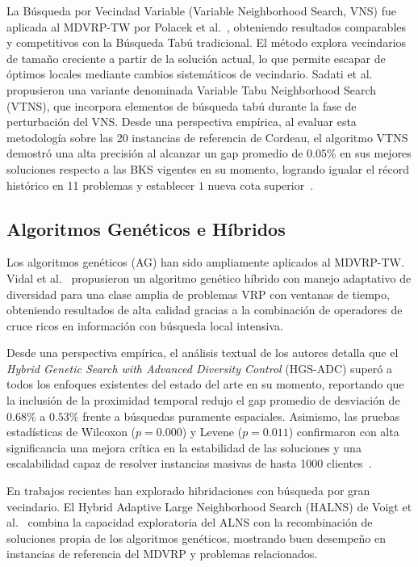 \documentclass[letter, 10pt, dvipdfmx]{article}
\begin{document}
La Búsqueda por Vecindad Variable (Variable Neighborhood Search, VNS) fue aplicada al MDVRP-TW por Polacek et al.~\cite{VNS2004},
obteniendo resultados comparables y competitivos con la Búsqueda Tabú tradicional. El método explora vecindarios de tamaño
creciente a partir de la solución actual, lo que permite escapar de óptimos locales mediante cambios
sistemáticos de vecindario.
Sadati et al.~\cite{Sadati2021} propusieron una variante denominada Variable Tabu Neighborhood Search (VTNS),
que incorpora elementos de búsqueda tabú durante la fase de perturbación del VNS.
Desde una perspectiva empírica, al evaluar esta metodología sobre las 20 instancias de referencia de Cordeau,
el algoritmo VTNS demostró una alta precisión al alcanzar un gap promedio de $0.05\%$ en sus mejores soluciones
respecto a las BKS vigentes en su momento, logrando igualar el récord histórico en 11 problemas y establecer $1$ nueva
cota superior~\cite{Sadati2021}.

\subsection{Algoritmos Genéticos e Híbridos}

Los algoritmos genéticos (AG) han sido ampliamente aplicados al MDVRP-TW. Vidal et al.~\cite{VidalAG2013}
propusieron un algoritmo genético híbrido con manejo adaptativo de diversidad para una
clase amplia de problemas VRP con ventanas de tiempo, obteniendo resultados de alta calidad
gracias a la combinación de operadores de cruce ricos en información con búsqueda local
intensiva.

Desde una perspectiva empírica, el análisis textual de los autores detalla que el \textit{Hybrid Genetic Search with Advanced Diversity Control} (HGS-ADC) superó a todos
los enfoques existentes del estado del arte en su momento, reportando que la inclusión de la proximidad temporal redujo
el gap promedio de desviación de $0.68\%$ a $0.53\%$ frente a búsquedas puramente espaciales. Asimismo, las
pruebas estadísticas de Wilcoxon ($p=0.000$) y Levene ($p=0.011$) confirmaron con alta significancia una mejora
crítica en la estabilidad de las soluciones y una escalabilidad capaz de resolver instancias masivas de hasta 1000
clientes~\cite{VidalAG2013}.

En trabajos recientes han explorado hibridaciones con búsqueda por gran vecindario.
El Hybrid Adaptive Large Neighborhood Search (HALNS) de Voigt et al.~\cite{HALNS2022} combina la capacidad
exploratoria del ALNS con la recombinación de soluciones propia de los algoritmos genéticos,
mostrando buen desempeño en instancias de referencia del MDVRP y problemas relacionados.
\end{document}
